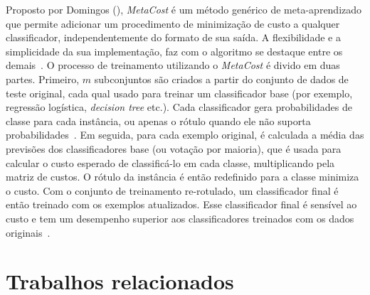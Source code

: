 Proposto por Domingos (\citeyear{Domingos1999}), \textit{MetaCost} é um método genérico de meta-aprendizado que permite adicionar um procedimento de minimização de custo a qualquer classificador, independentemente do formato de sua saída. A flexibilidade e a simplicidade da sua implementação, faz com o algoritmo se destaque entre os demais~\cite[text]{FernndezCs2018, Wang2018}. O processo de treinamento utilizando o \textit{MetaCost} é divido em duas partes. Primeiro, \(m\) subconjuntos são criados a partir do conjunto de dados de teste original, cada qual usado para treinar um classificador base (por exemplo, regressão logística, \textit{decision tree} etc.). Cada classificador gera probabilidades de classe para cada instância, ou apenas o rótulo quando ele não suporta probabilidades~\cite{Araf2024}. Em seguida, para cada exemplo original, é calculada a média das previsões dos classificadores base (ou votação por maioria), que é usada para calcular o custo esperado de classificá-lo em cada classe, multiplicando pela matriz de custos. O rótulo da instância é então redefinido para a classe minimiza o custo. Com o conjunto de treinamento re-rotulado, um classificador final é então treinado com os exemplos atualizados. Esse classificador final é sensível ao custo e tem um desempenho superior aos classificadores treinados com os dados originais~\cite{Chen2021}.

\section{Trabalhos relacionados}